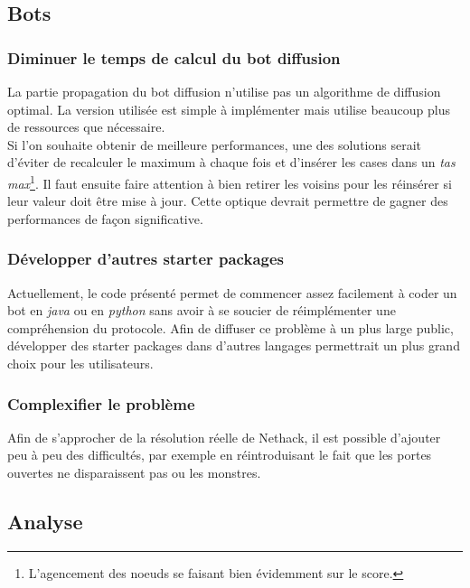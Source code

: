 \documentclass[a4paper,12pt]{article}
\begin{document}
\subsection{Bots}
\subsubsection{Diminuer le temps de calcul du bot diffusion}
La partie propagation du bot diffusion n'utilise pas un algorithme de diffusion
optimal. La version utilisée est simple à implémenter mais utilise beaucoup plus
de ressources que nécessaire.
\\
Si l'on souhaite obtenir de meilleure performances, une des solutions serait
d'éviter de recalculer le maximum à chaque fois et d'insérer les cases dans un
{\em tas max}\footnote{L'agencement des noeuds se faisant bien évidemment sur le
  score.}. Il faut ensuite faire attention à bien retirer les voisins pour les
réinsérer si leur valeur doit être mise à jour. Cette optique devrait permettre
de gagner des performances de façon significative.

\subsubsection{Développer d'autres starter packages}
Actuellement, le code présenté permet de commencer assez facilement à coder un
bot en {\em java} ou en {\em python} sans avoir à se soucier de réimplémenter
une compréhension du protocole. Afin de diffuser ce problème à un plus large
public, développer des starter packages dans d'autres langages permettrait un
plus grand choix pour les utilisateurs.

\subsubsection{Complexifier le problème}
Afin de s'approcher de la résolution réelle de Nethack, il est possible
d'ajouter peu à peu des difficultés, par exemple en réintroduisant le fait que
les portes ouvertes ne disparaissent pas ou les monstres.

\subsection{Analyse}
\end{document}
